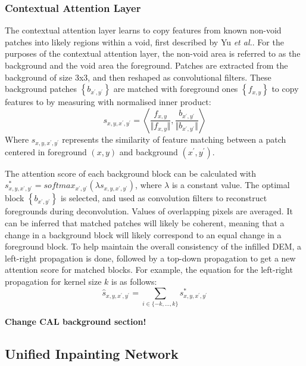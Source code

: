 \documentclass[twocolumn]{article}
\begin{document}
\subsubsection{Contextual Attention Layer}
\label{sec:orgc7f2dc6}
The contextual attention layer learns to copy features from known non-void patches into likely regions within a void, first described by Yu \emph{et al.}\autocite{yuGenerativeImageInpainting2018}.
For the purposes of the contextual attention layer, the non-void area is referred to as the background and the void area the foreground.
Patches are extracted from the background of size 3x3, and then reshaped as convolutional filters.
These background patches \(\left\{ b_{x^{\prime}, y^{\prime}} \right\}\) are matched with foreground ones \(\left\{ f_{x,y} \right\}\) to copy features to by measuring with normalised inner product:
\begin{equation}
s_{x,y,x^\prime,y^\prime} = \left \langle \frac{f_{x,y}}{\Vert f_{x,y} \Vert}, \frac{b_{x^\prime,y^\prime}}{\Vert b_{x^\prime,y^\prime} \Vert} \right \rangle
\end{equation}
Where \(s_{x,y,x^\prime,y^\prime}\) represents the similarity of feature matching between a patch centered in foreground \((x,y)\) and background \((x^\prime, y^\prime)\).

The attention score of each background block can be calculated with \(s^*_{x,y,x^\prime,y^\prime} = softmax_{x^\prime, y^\prime} \left( \lambda s_{x,y,x^\prime,y^\prime} \right)\), where \(\lambda\) is a constant value.
The optimal block \(\left \{ b_{x^\prime, y^\prime} \right\}\) is selected, and used as convolution filters to reconstruct foregrounds during deconvolution.
Values of overlapping pixels are averaged.
It can be inferred that matched patches will likely be coherent, meaning that a change in a background block will likely correspond to an equal change in a foreground block.
To help maintain the overall consistency of the infilled DEM, a left-right propagation is done, followed by a top-down propagation to get a new attention score for matched blocks.
For example, the equation for the left-right propagation for kernel size \(k\) is as follows:
\begin{equation}
\hat{s}_{x,y,x^\prime,y^\prime} = \sum_{i \in \{-k,\dots,k\}} s^*_{x,y,x^\prime,y^\prime}
\end{equation}

\textbf{Change CAL background section!}

\subsection{Unified Inpainting Network}
\label{sec:org263b305}
\end{document}
